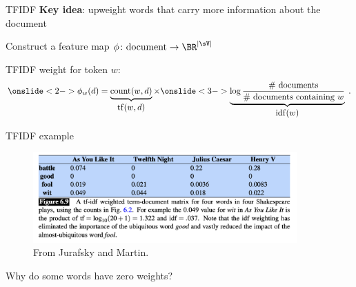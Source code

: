 \documentclass[usenames,dvipsnames,notes,11pt,aspectratio=169]{beamer}
\newcommand{\pdfnote}[1]{}
\begin{document}
\begin{frame}
    {TFIDF}
    \textbf{Key idea}: upweight words that carry more information about the document
    \pause

    Construct a feature map $\phi\colon \text{document} \rightarrow \BR^{|\sV|}$

    TFIDF weight for token $w$:\\
    $$
    \onslide<2->{
        \phi_w(d) = \underbrace{\text{count}(w, d)}_{\textstyle \mathrm{tf}(w, d)} \times 
    }
    \onslide<3->{
        \underbrace{\log \frac{\text{\# documents}}{\textstyle\text{\# documents containing $w$}}}_{\textstyle \mathrm{idf}(w)}
    \;.
    }
    $$

    \begin{itemize}
    \end{itemize}
\end{frame}

\begin{frame}
    {TFIDF example}
    \begin{figure}
        \includegraphics[width=0.9\textwidth]{figures/tfidf}
        \caption{From Jurafsky and Martin.}
    \end{figure}

    Why do some words have zero weights?
\end{frame}

%
%
\end{document}
